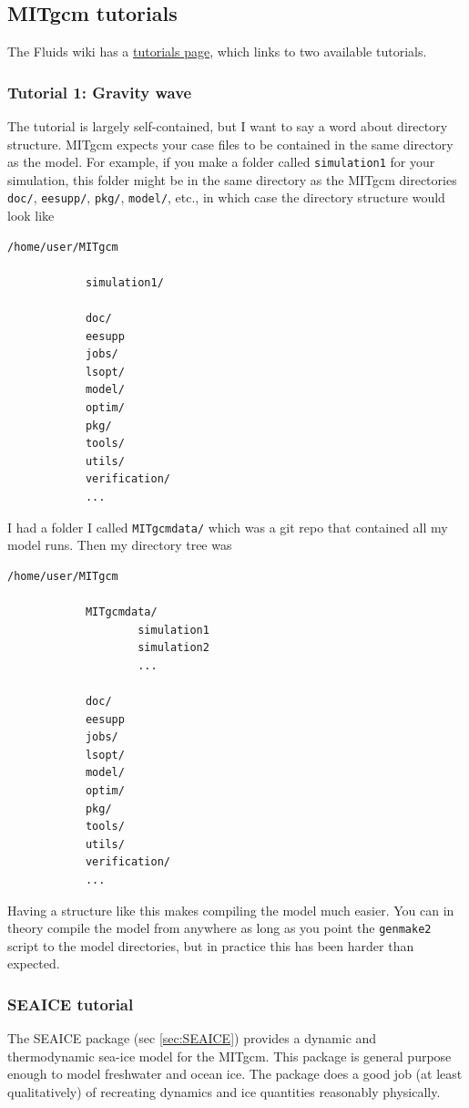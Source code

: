 \documentclass[11pt]{article}
\begin{document}
\subsection{MITgcm tutorials}
The Fluids wiki has a \href{https://wiki.math.uwaterloo.ca/fluidswiki/index.php?title=MITgcm_Tutorials}{tutorials page}, which links to two available tutorials.

\subsubsection{Tutorial 1: Gravity wave}
The tutorial is largely self-contained, but I want to say a word about directory structure. MITgcm expects your case files to be contained in the same directory as the model. For example, if you make a folder called \verb|simulation1| for your simulation, this folder might be in the same directory as the MITgcm directories \verb|doc/|, \verb|eesupp/|, \verb|pkg/|, \verb|model/|, etc., in which case the directory structure would look like

\begin{lstlisting}
/home/user/MITgcm
			
			simulation1/

			doc/
			eesupp
			jobs/
			lsopt/
			model/
			optim/
			pkg/
			tools/
			utils/
			verification/
			...
\end{lstlisting}

I had a folder I called \verb|MITgcmdata/| which was a git repo that contained all my model runs. Then my directory tree was

\begin{lstlisting}
/home/user/MITgcm
			
			MITgcmdata/
					simulation1
					simulation2
					...

			doc/
			eesupp
			jobs/
			lsopt/
			model/
			optim/
			pkg/
			tools/
			utils/
			verification/
			...
\end{lstlisting}

Having a structure like this makes compiling the model much easier. You can in theory compile the model from anywhere as long as you point the \verb|genmake2| script to the model directories, but in practice this has been harder than expected.

\subsubsection{SEAICE tutorial}
The SEAICE package (sec \ref{sec:SEAICE}) provides a dynamic and thermodynamic sea-ice model for the MITgcm. This package is general purpose enough to model freshwater and ocean ice. The package does a good job (at least qualitatively) of recreating dynamics and ice quantities reasonably physically.
\end{document}
